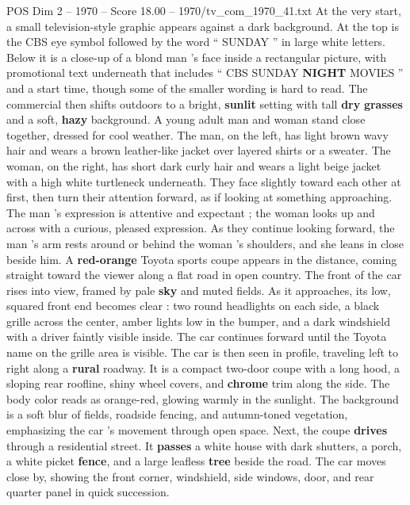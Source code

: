 \begin{textsample}{POS Dim 2 – 1970 – Score 18.00 – 1970/tv\_com\_1970\_41.txt}  \label{ex:f2_pos_073}
At the very start, a small television-style graphic appears against a dark background.
At the top is the CBS eye symbol followed by the word “ SUNDAY ” in large white letters.
Below it is a close-up of a blond man ’s face inside a rectangular picture, with promotional text underneath that includes “ CBS SUNDAY \textbf{NIGHT} MOVIES ” and a start time, though some of the smaller wording is hard to read.
The commercial then shifts outdoors to a bright, \textbf{sunlit} setting with tall \textbf{dry} \textbf{grasses} and a soft, \textbf{hazy} background.
A young adult man and woman stand close together, dressed for cool weather.
The man, on the left, has light brown wavy hair and wears a brown leather-like jacket over layered shirts or a sweater.
The woman, on the right, has short dark curly hair and wears a light beige jacket with a high white turtleneck underneath.
They face slightly toward each other at first, then turn their attention forward, as if looking at something approaching.
The man ’s expression is attentive and expectant ; the woman looks up and across with a curious, pleased expression.
As they continue looking forward, the man ’s arm rests around or behind the woman ’s shoulders, and she leans in close beside him.
A \textbf{red-orange} Toyota sports coupe appears in the distance, coming straight toward the viewer along a flat road in open country.
The front of the car rises into view, framed by pale \textbf{sky} and muted fields.
As it approaches, its low, squared front end becomes clear : two round headlights on each side, a black grille across the center, amber lights low in the bumper, and a dark windshield with a driver faintly visible inside.
The car continues forward until the Toyota name on the grille area is visible.
The car is then seen in profile, traveling left to right along a \textbf{rural} roadway.
It is a compact two-door coupe with a long hood, a sloping rear roofline, shiny wheel covers, and \textbf{chrome} trim along the side.
The body color reads as orange-red, glowing warmly in the sunlight.
The background is a soft blur of fields, roadside fencing, and autumn-toned vegetation, emphasizing the car ’s movement through open space.
Next, the coupe \textbf{drives} through a residential street.
It \textbf{passes} a white house with dark shutters, a porch, a white picket \textbf{fence}, and a large leafless \textbf{tree} beside the road.
The car moves close by, showing the front corner, windshield, side windows, door, and rear quarter panel in quick succession.

\end{textsample}
